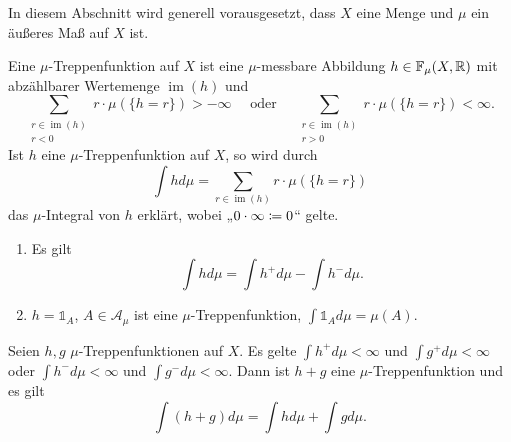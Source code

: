 \documentclass[a4paper,twoside,DIV15,BCOR12mm]{scrbook}
\newcommand{\A}{\mathcal A}
\newcommand{\ind}{\mathds 1}
\DeclareMathOperator{\im}{im}
\begin{document}
In diesem Abschnitt wird generell vorausgesetzt, dass $X$ eine Menge und $\mu$ ein äußeres Maß auf $X$ ist.

\begin{definition}
Eine $\mu$-Treppenfunktion auf $X$ ist eine $\mu$-messbare Abbildung $h\in \mathbb F_\mu(X,\mathbb{R})$ mit abzählbarer Wertemenge $\im(h)$ und
\[
\sum_{\substack{r\in \im(h)\\r< 0}} r \cdot \mu(\{h=r\}) > -\infty \quad\text{ oder }\quad
\sum_{\substack{r\in \im(h)\\r> 0}} r \cdot \mu(\{h=r\}) < \infty.
\]
Ist $h$ eine $\mu$-Treppenfunktion auf $X$, so wird durch
\[
\int hd\mu = \sum_{r\in \im(h)} r \cdot \mu(\{h=r\})
\]
das $\mu$-Integral von $h$ erklärt, wobei „$0\cdot \infty\da 0$“ gelte.
\end{definition}

\begin{bemerkung}
\begin{enumerate}
\item  Es gilt
\[
\int h d\mu = \int h^+ d\mu - \int h^- d\mu.
\]
\item $h=\ind_A$, $A\in\A_\mu$ ist eine $\mu$-Treppenfunktion, $\int \ind_A d\mu=\mu(A)$.
\end{enumerate}
\end{bemerkung}

\begin{lemma}
\label{lem1.10}
Seien $h,g$ $\mu$-Treppenfunktionen auf $X$. Es gelte $\int h^+ d\mu <\infty$ und $\int g^+ d\mu<\infty$  oder $\int h^- d\mu <\infty$ und $\int g^- d\mu<\infty$. Dann ist $h+g$ eine $\mu$-Treppenfunktion und es gilt
\[
\int (h+g) d\mu = \int h d\mu + \int g d\mu.
\]
\end{lemma}
\end{document}
